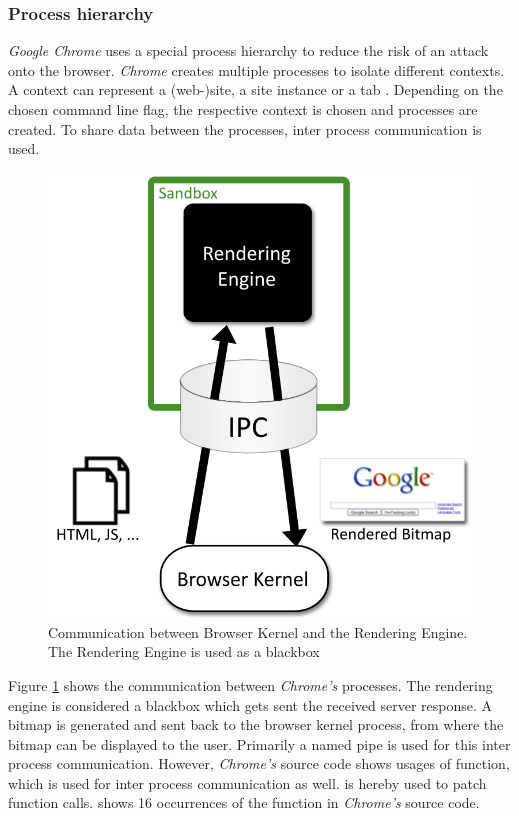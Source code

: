 \subsubsection{Process hierarchy}
\emph{Google Chrome} uses a special process hierarchy to reduce the risk of an attack onto the browser. \emph{Chrome} creates multiple processes to isolate different contexts. A context can represent a (web-)site, a site instance or a tab \cite{chromium_process_models}. Depending on the chosen command line flag, the respective context is chosen and processes are created. To share data between the processes, inter process communication is used.
\begin{figure}[!htbp]
\centering
\includegraphics[scale=0.5]{sections/background/chrome/communication.png}
\caption{Communication between Browser Kernel and the Rendering Engine. The Rendering Engine is used as a blackbox \cite{chromium_security_architecture}}
\label{fig:chrome_communication}
\end{figure}
Figure \ref{fig:chrome_communication} shows the communication between \emph{Chrome's} processes. The rendering engine is considered a blackbox which gets sent the received server response. A bitmap is generated and sent back to the browser kernel process, from where the bitmap can be displayed to the user. Primarily a named pipe \cite{chromium_security_architecture} is used for this inter process communication. However, \emph{Chrome's} source code shows usages of  function, which is used for inter process communication as well.  is hereby used to patch function calls. \cite{chromium_source_writeprocessmemory} shows 16 occurrences of the  function in \emph{Chrome's} source code.